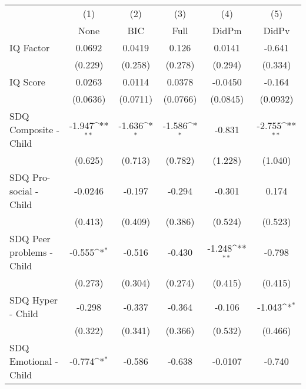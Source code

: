 {
\def\sym#1{\ifmmode^{#1}\else\(^{#1}\)\fi}
\begin{tabular}{l*{5}{c}}
\toprule
            &\multicolumn{1}{c}{(1)}&\multicolumn{1}{c}{(2)}&\multicolumn{1}{c}{(3)}&\multicolumn{1}{c}{(4)}&\multicolumn{1}{c}{(5)}\\
            &\multicolumn{1}{c}{None}&\multicolumn{1}{c}{BIC}&\multicolumn{1}{c}{Full}&\multicolumn{1}{c}{DidPm}&\multicolumn{1}{c}{DidPv}\\
\midrule
IQ Factor   &      0.0692         &      0.0419         &       0.126         &      0.0141         &      -0.641         \\
            &     (0.229)         &     (0.258)         &     (0.278)         &     (0.294)         &     (0.334)         \\
\addlinespace
IQ Score    &      0.0263         &      0.0114         &      0.0378         &     -0.0450         &      -0.164         \\
            &    (0.0636)         &    (0.0711)         &    (0.0766)         &    (0.0845)         &    (0.0932)         \\
\addlinespace
SDQ Composite - Child&      -1.947\sym{**} &      -1.636\sym{*}  &      -1.586\sym{*}  &      -0.831         &      -2.755\sym{**} \\
            &     (0.625)         &     (0.713)         &     (0.782)         &     (1.228)         &     (1.040)         \\
\addlinespace
SDQ Pro-social - Child&     -0.0246         &      -0.197         &      -0.294         &      -0.301         &       0.174         \\
            &     (0.413)         &     (0.409)         &     (0.386)         &     (0.524)         &     (0.523)         \\
\addlinespace
SDQ Peer problems - Child&      -0.555\sym{*}  &      -0.516         &      -0.430         &      -1.248\sym{**} &      -0.798         \\
            &     (0.273)         &     (0.304)         &     (0.274)         &     (0.415)         &     (0.415)         \\
\addlinespace
SDQ Hyper - Child&      -0.298         &      -0.337         &      -0.364         &      -0.106         &      -1.043\sym{*}  \\
            &     (0.322)         &     (0.341)         &     (0.366)         &     (0.532)         &     (0.466)         \\
\addlinespace
SDQ Emotional - Child&      -0.774\sym{*}  &      -0.586         &      -0.638         &     -0.0107         &      -0.740         \\

\end{tabular}}
